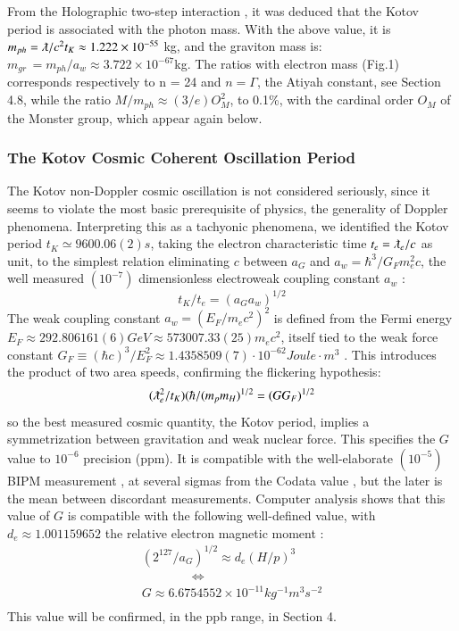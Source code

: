 \documentclass[twoside,draft]{article}
\begin{document}
\begin{sloppypar}
{From the Holographic two-step interaction \cite{Sanchez1}, it was deduced that the Kotov period is
associated with the photon mass. With the above value, it is $m_{ph} = \lambdabar/c^{2} t_{K} \approx 1.222 \times 10^{-55}$ kg, and the graviton mass is: 
$m_{gr}\, = m_{ph} /a_{w} \approx 3.722 \times 10^{-67} $kg.
The ratios with electron mass (Fig.1) corresponds respectively to n = 24 and $n = \Gamma$, the Atiyah constant, see Section 4.8, while the ratio $M/m_{ph} \approx (3/e)O^2_M$, to 0.1\%, with the cardinal order $O_M$ of the Monster group, which appear again below.

\subsubsection{The Kotov Cosmic Coherent Oscillation Period}

The Kotov non-Doppler cosmic oscillation \cite{Sanchez1} is not considered seriously, since it seems to
violate the most basic prerequisite of physics, the generality of Doppler phenomena. Interpreting
this as a tachyonic phenomena, we identified the Kotov period $t_{K} \simeq 9600.06(2) s$, taking the electron
characteristic time $t_{e} = \lambdabar_{e} /c$ as unit, to the simplest relation eliminating $c$ between $a_{G}$ and $a_{w}=
\hbar^{3} /G_{F} m_{e}^{2} c$, the well measured $(10^{-7})$ dimensionless electroweak coupling constant $a_{w}$ :
\begin{equation}
t_{K} / t_{e} = (a_{G} a_{w})^{1/2}
\end{equation}
The weak coupling constant \cite{Carr} $a_{w} = (E_{F} /m_{e} c^{2} )^{2}$ is defined from the Fermi energy 
$
E_{F} \approx 292.806161(6) GeV \approx 573007.33(25) m_{e} c^{2}
$, itself tied to the weak force constant 
$
G_{F} \equiv (\hbar c)^{3} /E_{F}^{2} \approx
1.4358509(7) \cdot 10^{-62} Joule \cdot m^{3}
$
. This introduces the product of two area speeds, confirming the
flickering hypothesis:
\begin{equation}
(\lambdabar_{e}^2/t_{K} )(\hbar/(m_{p} m_{H})^{1/2} = (GG_{F})^{1/2}
\end{equation}
so the best measured cosmic quantity, the Kotov period, implies a symmetrization between
gravitation and weak nuclear force. This specifies the $G$ value to $10^{-6}$ precision (ppm). It is
compatible with the well-elaborate $(10^{-5})$ BIPM measurement \cite{Quinn}, at several sigmas from the Codata
value \cite{Tanabashi}, but the later is the mean between discordant measurements.
Computer analysis shows that this value of $G$ is compatible with the following well-defined value, with $d_{e} \approx 1.001159652$ the relative electron magnetic moment :
$$\begin{array}{ll}
(2^{127} /a_{G} )^{1/2} \approx d_{e} (H/p)^{3} \\
\qquad  \qquad \Leftrightarrow \\
G \approx 6.6754552 \times 10^{-11} kg^{-1} m^{3} s^{-2} \\
\end{array}$$
This value will be confirmed, in the ppb range, in Section 4.

}
\end{sloppypar}
\end{document}
